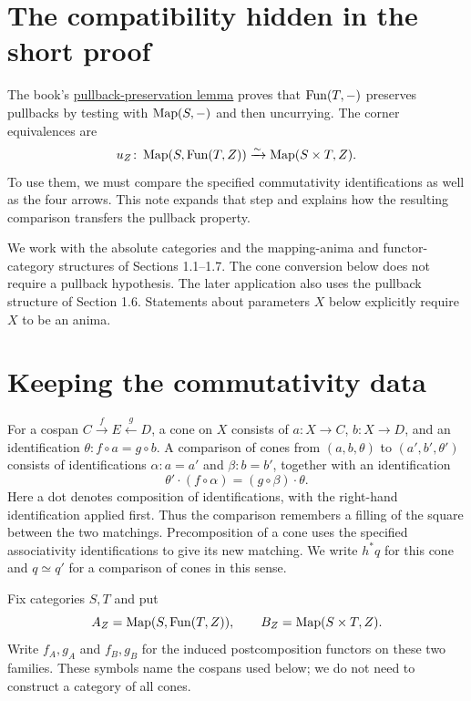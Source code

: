 \documentclass[11pt]{article}
\begin{document}
\section*{The compatibility hidden in the short proof}

The book's \href{functor-categories.html\#lem:Functor_Category_Preserves_Pullbacks}{pullback-preservation lemma}
proves that $\operatorname{Fun}(T,-)$ preserves pullbacks by testing with $\operatorname{Map}(S,-)$ and
then uncurrying. The corner equivalences are
\[
  u_Z\colon \operatorname{Map}(S,\operatorname{Fun}(T,Z))\xrightarrow{\sim}\operatorname{Map}(S\times T,Z).
\]
To use them, we must compare the specified commutativity identifications as
well as the four arrows. This note expands that step and explains how the
resulting comparison transfers the pullback property.

We work with the absolute categories and the mapping-anima and functor-category
structures of Sections 1.1--1.7. The cone conversion below does not require a
pullback hypothesis. The later application also uses the pullback structure of
Section 1.6. Statements about parameters $X$ below explicitly require $X$ to be
an anima.

\section*{Keeping the commutativity data}

For a cospan $C\xrightarrow{f}E\xleftarrow{g}D$, a cone on $X$ consists of
$a\colon X\to C$, $b\colon X\to D$, and an identification
$\theta\colon f\circ a=g\circ b$. A
comparison of cones
from $(a,b,\theta)$ to $(a',b',\theta')$ consists of identifications
$\alpha\colon a=a'$ and $\beta\colon b=b'$, together with an identification
\[
  \theta'\cdot(f\circ\alpha)=(g\circ\beta)\cdot\theta.
\]
Here a dot denotes composition of identifications, with the right-hand
identification applied first. Thus the comparison remembers a filling of the
square between the two matchings. Precomposition of a cone uses the specified
associativity identifications to give its new matching. We write $h^*q$ for
this cone and $q\simeq q'$ for a comparison of cones in this sense.

Fix categories $S,T$ and put
\[
 A_Z=\operatorname{Map}(S,\operatorname{Fun}(T,Z)),\qquad B_Z=\operatorname{Map}(S\times T,Z).
\]
Write $f_A,g_A$ and $f_B,g_B$ for the induced postcomposition functors on
these two families. These symbols name the cospans used below; we do not need
to construct a category of all cones.
\end{document}
